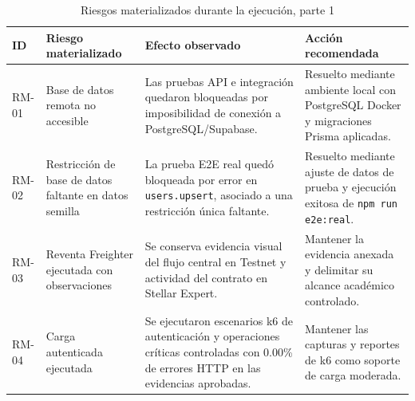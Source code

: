 \documentclass[12pt,letterpaper]{article}
\begin{document}
\begin{table}[H]
\centering
\begingroup
\scriptsize
\setlength{\tabcolsep}{2.5pt}
\renewcommand{\arraystretch}{1.18}

\begin{tabularx}{\textwidth}{|
>{\centering\arraybackslash}p{1.3cm}|
>{\raggedright\arraybackslash}p{4.0cm}|
>{\raggedright\arraybackslash}p{4.0cm}|
>{\raggedright\arraybackslash}X|}
\hline
\textbf{ID} & \textbf{Riesgo materializado} & \textbf{Efecto observado} & \textbf{Acción recomendada} \\
\hline
RM-01 & Base de datos remota no accesible & Las pruebas API e integración quedaron bloqueadas por imposibilidad de conexión a PostgreSQL/Supabase. & Resuelto mediante ambiente local con PostgreSQL Docker y migraciones Prisma aplicadas. \\
\hline
RM-02 & Restricción de base de datos faltante en datos semilla & La prueba E2E real quedó bloqueada por error en \texttt{users.upsert}, asociado a una restricción única faltante. & Resuelto mediante ajuste de datos de prueba y ejecución exitosa de \texttt{npm run e2e:real}. \\
\hline
RM-03 & Reventa Freighter ejecutada con observaciones & Se conserva evidencia visual del flujo central en Testnet y actividad del contrato en Stellar Expert. & Mantener la evidencia anexada y delimitar su alcance académico controlado. \\
\hline
RM-04 & Carga autenticada ejecutada & Se ejecutaron escenarios k6 de autenticación y operaciones críticas controladas con 0.00\% de errores HTTP en las evidencias aprobadas. & Mantener las capturas y reportes de k6 como soporte de carga moderada. \\
\hline
\end{tabularx}

\endgroup
\caption{Riesgos materializados durante la ejecución, parte 1}
\label{tab:riesgos-materializados-1}
\end{table}
\end{document}

